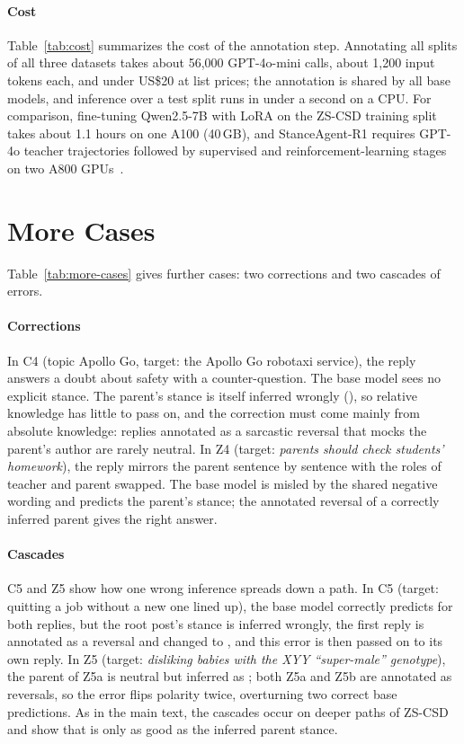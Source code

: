 \paragraph{Cost}
Table~\ref{tab:cost} summarizes the cost of the annotation step. Annotating all splits of all three datasets takes about 56{,}000 GPT-4o-mini calls, about 1{,}200 input tokens each, and under US\$20 at list prices; the annotation is shared by all base models, and inference over a test split runs in under a second on a CPU. For comparison, fine-tuning Qwen2.5-7B with LoRA on the ZS-CSD training split takes about 1.1 hours on one A100 (40\,GB), and StanceAgent-R1 requires GPT-4o teacher trajectories followed by supervised and reinforcement-learning stages on two A800 GPUs~\cite{li2026stanceagent}.

\section{More Cases}
\label{app:cases}

Table~\ref{tab:more-cases} gives further cases: two corrections and two cascades of errors.

\paragraph{Corrections}
In C4 (topic Apollo Go, target: the Apollo Go robotaxi service), the reply answers a doubt about safety with a counter-question. The base model sees no explicit stance. The parent's stance is itself inferred wrongly (\nonelabel{}), so relative knowledge has little to pass on, and the correction must come mainly from absolute knowledge: replies annotated as a sarcastic reversal that mocks the parent's author are rarely neutral. In Z4 (target: \emph{parents should check students' homework}), the reply mirrors the parent sentence by sentence with the roles of teacher and parent swapped. The base model is misled by the shared negative wording and predicts the parent's stance; the annotated reversal of a correctly inferred parent gives the right answer.

\paragraph{Cascades}
C5 and Z5 show how one wrong inference spreads down a path. In C5 (target: quitting a job without a new one lined up), the base model correctly predicts \nonelabel{} for both replies, but the root post's stance is inferred wrongly, the first reply is annotated as a reversal and changed to \against{}, and this error is then passed on to its own reply. In Z5 (target: \emph{disliking babies with the XYY ``super-male'' genotype}), the parent of Z5a is neutral but inferred as \against{}; both Z5a and Z5b are annotated as reversals, so the error flips polarity twice, overturning two correct base predictions. As in the main text, the cascades occur on deeper paths of ZS-CSD and show that \spin{} is only as good as the inferred parent stance.

